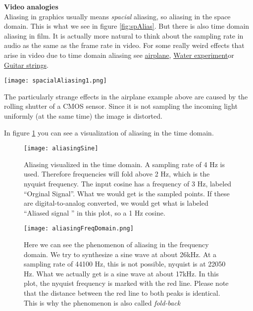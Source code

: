 \begin{framed}
	\textbf{Video analogies}\\
	Aliasing in graphics usually means \textit{spacial} aliasing, so aliasing in the space domain. This is what we see in figure \ref{fig:spAlias}. But there is also time domain aliasing in film. It is actually more natural to think about the sampling rate in audio as the same as the frame rate in video. For some really weird effects that arise in video due to time domain aliasing see \href{https://www.youtube.com/watch?v=LVwmtwZLG88}{airplane}\footnotemark , \href{https://www.youtube.com/watch?v=GBtHeR-hY9Y}{Water experiment}\footnotemark or \href{https://www.youtube.com/watch?v=jcOKTTnOIV8}{Guitar strings}\footnotemark .
	\begin{center}
		\texttt{[image: spacialAliasing1.png]}
		\label{fig:spAlias}
	\end{center}
	The particularly strange effects in the airplane example above are caused by the rolling shutter of a CMOS sensor. Since it is not sampling the incoming light uniformly (at the same time) the image is distorted.
\end{framed}


In figure \ref{fig:cosAlias} you can see a visualization of aliasing in the time domain.

\begin{figure}[H]
	\centering
	\texttt{[image: aliasingSine]}
	\caption[Aliasing]
	{Aliasing visualized in the time domain. A sampling rate of 4 Hz is used. Therefore frequencies will fold above 2 Hz, which is the nyquist frequency. The input cosine has a frequency of 3 Hz, labeled ``Orginal Signal''. What we would get is the sampled points. If these are digital-to-analog converted, we would get what is labeled ``Aliased signal '' in this plot, so a 1 Hz cosine.}
	\label{fig:cosAlias}
\end{figure}



\begin{figure}[H]
	\begin{center}
		\texttt{[image: aliasingFreqDomain.png]}
		\caption[Aliasing in the Frequency Domain]
		{Here we can see the phenomenon of aliasing in the frequency domain. We try to synthesize a sine wave at about 26kHz. At a sampling rate of 44100 Hz, this is not possible, nyquist is at 22050 Hz. What we actually get is a sine wave at about 17kHz. In this plot, the nyquist frequency is marked with the red line. Please note that the distance between the red line to both peaks is identical. This is why the phenomenon is also called \textit{fold-back}}
		\label{fig:name}
	\end{center}
\end{figure}





